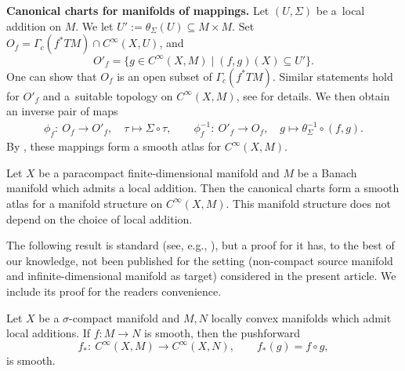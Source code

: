 {\bf Canonical charts for manifolds of mappings.}
Let $(U,\Sigma)$ be a~local addition on $M$.
We let $U' := \theta_\Sigma (U) \subseteq M \times M$.
Set $O_{f} = \Gamma_c(f^{*}TM) \cap C^{\infty}(X, U)$, and
\begin{equation*}
 O'_{f} = \bigl\{ g \in C^{\infty}(X,M) \mid (f,g)(X) \subseteq U' \bigr\}.
\end{equation*}
One can show that $O_{f}$ is an open subset of $\Gamma_c(f^\ast TM)$. Similar statements hold for $O'_f$ and a~suitable topology on $C^\infty(X,M)$, see \cite[proof of Theorem~1.4]{GaS22} for details.
We then obtain an inverse pair of maps
\begin{align}\label{eq:can_charts}
 \phi_{f}\colon\ O_{f}\rightarrow O'_{f},\quad \tau \mapsto \Sigma \circ \tau, \qquad
 \phi_{f}^{-1}\colon\ O'_{f} \rightarrow O_{f},\quad g \mapsto \theta_{\Sigma}^{-1} \circ (f,g).
\end{align}
By \cite[Theorem~1.4]{GaS22}, these mappings form a smooth atlas for $C^{\infty}(X,M)$.

\begin{Proposition}
 Let $X$ be a paracompact finite-dimensional manifold and $M$ be a Banach manifold which admits a local addition.
 Then the canonical charts %
 form a smooth atlas for a manifold structure on $C^\infty (X,M)$. This manifold structure does not depend on the choice of local addition.
\end{Proposition}

The following result is standard (see, e.g., \cite[Section 2]{Sch23}), but a proof for it has, to the best of our knowledge, not been published for the setting (non-compact source manifold and infinite-dimensional manifold as target) considered in the present article. We include its proof for the readers convenience.

\begin{Proposition}\label{prop:smooth_pf}
Let $X$ be a $\sigma$-compact manifold and $M,N$ locally convex manifolds which admit local additions. If $f \colon M \rightarrow N$ is smooth, then the pushforward
\begin{displaymath}f_\ast \colon \ C^\infty (X,M) \rightarrow C^\infty (X,N),\qquad f_\ast (g) =f \circ g,
\end{displaymath}
is smooth.
\end{Proposition}

